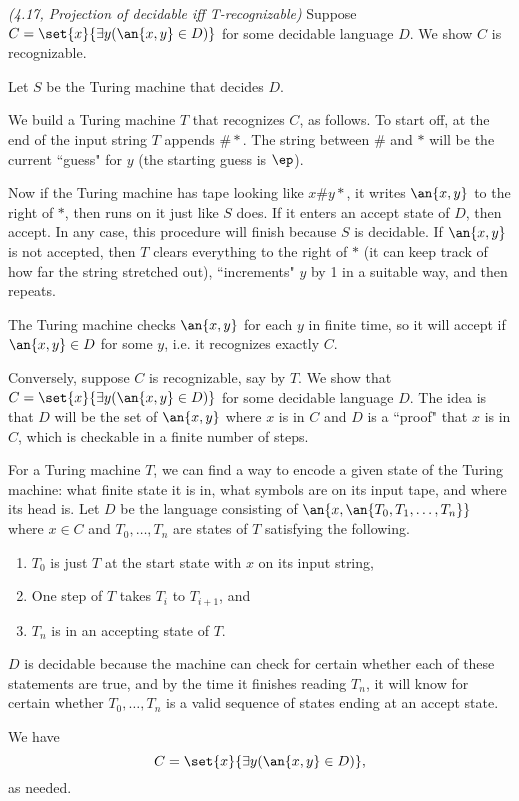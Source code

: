 \begin{problem}{\it (4.17, Projection of decidable iff T-recognizable)}
Suppose $C=\set{x}{\exists y(\an{x,y}\in D)}$ for some decidable language $D$. We show $C$ is recognizable.

Let $S$ be the Turing machine that decides $D$.

We build a Turing machine $T$ that recognizes $C$, as follows. To start off, at the end of the input string $T$ appends $\#*$. The string between $\#$ and $*$ will be the current ``guess" for $y$ (the starting guess is $\ep$).

Now if the Turing machine has tape looking like $x\#y*$, it writes $\an{x,y}$ to the right of $*$, then runs on it just like $S$ does. If it enters an accept state of $D$, then accept. In any case, this procedure will finish because $S$ is decidable. If $\an{x,y}$ is not accepted, then $T$ clears everything to the right of $*$ (it can keep track of how far the string stretched out), ``increments" $y$ by 1 in a suitable way, and then repeats.

The Turing machine checks $\an{x,y}$ for each $y$ in finite time, so it will accept if $\an{x,y}\in D$ for some $y$, i.e. it recognizes exactly $C$.

Conversely, suppose $C$ is recognizable, say by $T$. We show that $C=\set{x}{\exists y(\an{x,y}\in D)}$ for some decidable language $D$. The idea is that $D$ will be the set of $\an{x,y}$ where $x$ is in $C$ and $D$ is a ``proof" that $x$ is in $C$, which is checkable in a finite number of steps.

For a Turing machine $T$, we can find a way to encode a given state of the Turing machine: what finite state it is in, what symbols are on its input tape, and where its head is. Let
$D$ be the language consisting of $\an{x,\an{T_0,T_1,\ldots, T_n}}$ where $x\in C$ and $T_0,\ldots, T_n$ are states of $T$ satisfying the following.
\begin{enumerate}
\item
$T_0$ is just $T$ at the start state with $x$ on its input string,
\item 
One step of $T$ takes $T_i$ to $T_{i+1}$, and
\item
$T_n$ is in an accepting state of $T$.
\end{enumerate}
$D$ is decidable because the machine can check for certain whether each of these statements are true, and by the time it finishes reading $T_n$, it will know for certain whether $T_0,\ldots, T_n$ is a valid sequence of states ending at an accept state.

We have
\[
C=\set{x}{\exists y(\an{x,y}\in D)},
\]
as needed.
\end{problem}

